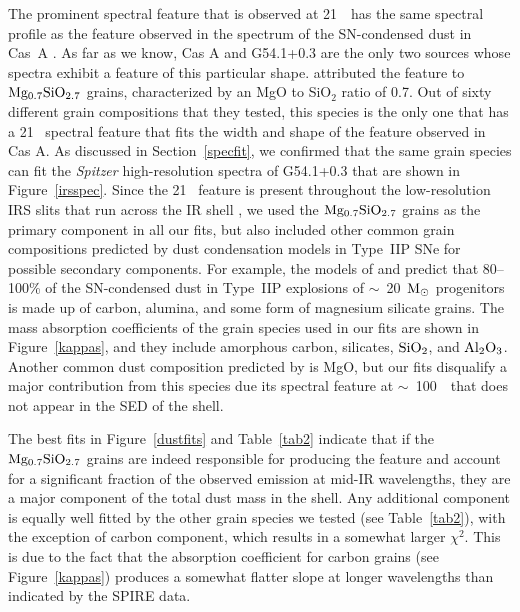 \documentclass{emulateapj}
\newcommand{\spitzer}{\textit{Spitzer }}
\begin{document}
The prominent spectral feature that is observed at 21~\micron\ has the same spectral profile as the feature observed in the spectrum of the SN-condensed dust in Cas~A \citep[][]{arendt99, ennis06}. As far as we know, Cas A and G54.1+0.3 are the only two sources whose spectra exhibit a feature of this particular shape. \citet{arendt14} attributed the feature to $\rm Mg_{0.7}SiO_{2.7}$ grains, characterized by an MgO to SiO$_2$ ratio of 0.7. Out of sixty different grain compositions that they tested, this species is the only one that has a 21 \micron\ spectral feature that fits the width and shape of the feature observed in Cas A. As discussed in Section~\ref{specfit}, we confirmed that the same grain species can fit the \spitzer high-resolution spectra of G54.1+0.3 that are shown in Figure~\ref{irsspec}. Since the 21 \micron\ feature is present throughout the low-resolution IRS slits that run across the IR shell \citep{temim10}, we used the $\rm Mg_{0.7}SiO_{2.7}$ grains as the primary component in all our fits, but also included other common grain compositions predicted by dust condensation models in Type~IIP SNe for possible secondary components. For example, the models of \citet{kozasa09} and \citet{sarangi15} predict that 80--100\% of the SN-condensed dust in Type~IIP explosions of $\sim$~20~$\rm M_{\odot}$ progenitors is made up of carbon, alumina, and some form of magnesium silicate grains. The mass absorption coefficients of the grain species used in our fits are shown in Figure~\ref{kappas}, and they include amorphous carbon, silicates, $\rm SiO_2$, and $\rm Al_2O_3$. Another common dust composition predicted by \citet{kozasa09} is MgO, but our fits disqualify a major contribution from this species due its spectral feature at $\sim$~100~\micron\ that does not appear in the SED of the shell.

The best fits in Figure~\ref{dustfits} and Table~\ref{tab2} indicate that if the $\rm Mg_{0.7}SiO_{2.7}$ grains are indeed responsible for producing the feature and account for a significant fraction of the observed emission at mid-IR wavelengths, they are a major component of the total dust mass in the shell. Any additional component is equally well fitted by the other grain species we tested (see Table~\ref{tab2}), with the exception of carbon component, which results in a somewhat larger $\chi^2$. This is due to the fact that the absorption coefficient for carbon grains (see Figure~\ref{kappas}) produces a somewhat flatter slope at longer wavelengths than indicated by the SPIRE data. 
\end{document}
